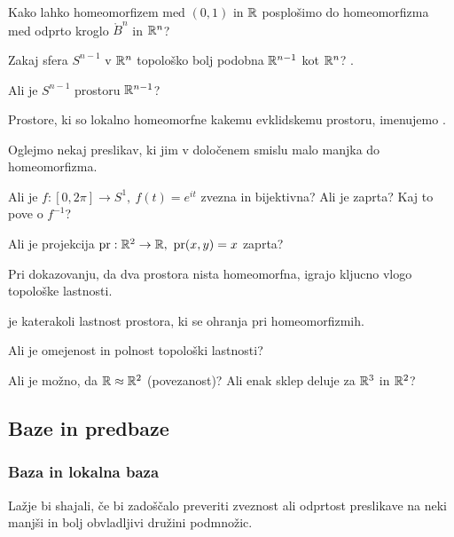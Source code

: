 \begin{primer}
    Kako lahko homeomorfizem med $(0, 1)$ in $\mathbb{R}$ posplošimo do homeomorfizma med odprto kroglo $\mathring{B}^n$ in $\mathbb{R}^n$?
\end{primer}

\begin{primer}
    Zakaj sfera $S^{n-1}$ v $\mathbb{R}^n$ topološko bolj podobna $\mathbb{R}^{n-1}$ kot $\mathbb{R}^n$? .

    Ali je $S^{n-1}$  prostoru $\mathbb{R}^{n-1}$?
\end{primer}

\begin{definicija}
    Prostore, ki so lokalno homeomorfne kakemu evklidskemu prostoru, imenujemo .
\end{definicija}

Oglejmo nekaj preslikav, ki jim v določenem smislu malo manjka do homeomorfizma.

\begin{primer}
    Ali je $f: [0, 2 \pi] \to S^1, \ f(t) = e^{it}$ zvezna in bijektivna? Ali je zaprta? Kaj to pove o $f^{-1}$?
\end{primer}

\begin{primer}
    Ali je projekcija $\pr: \R^2 \to \R, \ \pr(x,y) = x$ zaprta?
\end{primer}

Pri dokazovanju, da dva prostora nista homeomorfna, igrajo kljucno vlogo topološke lastnosti.

\begin{definicija}
     je katerakoli lastnost prostora, ki se ohranja pri homeomorfizmih.
\end{definicija}

\begin{primer}
    Ali je omejenost in polnost topološki lastnosti?
\end{primer}

\begin{primer}
    Ali je možno, da $\mathbb{R} \approx \mathbb{R}^2$ (povezanost)? Ali enak sklep deluje za $\mathbb{R}^3$ in $\mathbb{R}^2$?
\end{primer}

\newpage
\subsection{Baze in predbaze}
\subsubsection{Baza in lokalna baza}
Lažje bi shajali, če bi zadoščalo preveriti zveznost ali odprtost preslikave na neki manjši in bolj obvladljivi družini podmnožic.

